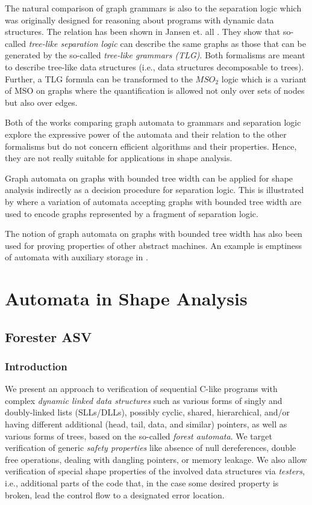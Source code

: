 	The natural comparison of graph grammars is also to the separation logic which was originally designed
	for reasoning about programs with dynamic data structures.
	The relation has been shown in Jansen et. all \cite{matheja_treelike_2015}.
	They show that so-called \emph{tree-like separation logic} can describe the same graphs
	as those that can be generated by the so-called \emph{tree-like grammars (TLG)}.
	Both formalisms are meant to describe tree-like data structures (i.e., data structures
	decomposable to trees).
	Further, a TLG formula can be transformed to the $MSO_2$ logic which is a variant of MSO
	on graphs where the quantification is allowed not only over sets of nodes but also
	over edges.

	Both of the works comparing graph automata to grammars and separation logic
	explore the expressive power of the automata and their relation to the other formalisms
	but do not concern efficient algorithms and their properties.
	Hence, they are not really suitable for applications in shape analysis.

	Graph automata on graphs with bounded tree width can be applied for shape analysis
	indirectly as a decision procedure for separation logic.
	This is illustrated by \cite{iosif_treewidth_2013} where a variation of automata
	accepting graphs with bounded tree width are used to encode graphs represented
	by a fragment of separation logic.

	The notion of graph automata on graphs with bounded tree width has also been used
	for proving properties of other abstract machines.
	An example is emptiness of automata with auxiliary storage in \cite{soa-popl11tw}.

\part{Automata in Shape Analysis}

\chapter{Forester ASV}
\label{ch:asv}
\section{Introduction}\label{sec:label}


We present an approach to verification of sequential C-like programs with complex \emph{dynamic linked
data structures} such as various forms of singly and doubly-linked lists
(SLLs/DLLs), possibly cyclic, shared, hierarchical, and/or having different
additional (head, tail, data, and similar) pointers, as well as various forms
of trees, based on the so-called \emph{forest automata}. 
We target verification of generic \emph{safety
properties} like
absence of null dereferences, double free operations, dealing with dangling
pointers, or memory leakage. We also allow verification of special shape properties of
the involved data structures via \emph{testers}, i.e., additional parts of the
code that, in the
case some desired property is broken, lead the control flow to a designated
error location.

